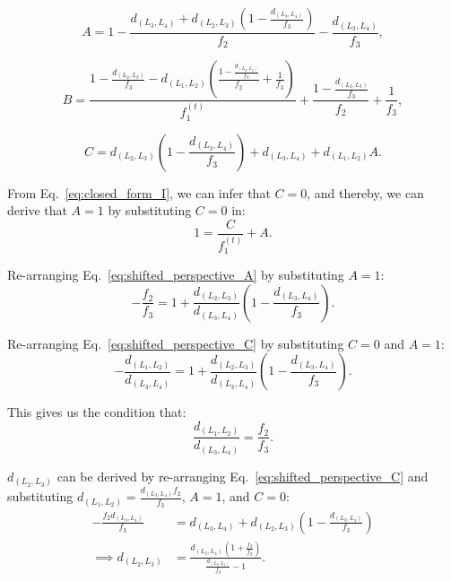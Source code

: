 \begin{equation}
    A = 1 - \frac{d_{(L_3,L_4)} + d_{(L_2,L_3)} \left(1 - \frac{d_{(L_3,L_4)}}{f_{3}}\right)}{f_{2}} - \frac{d_{(L_3,L_4)}}{f_{3}}, \label{eq:shifted_perspective_A}
\end{equation}

\begin{equation}
    B = \frac{1 - \frac{d_{(L_2,L_3)}}{f_{3}} - d_{(L_1,L_2)} \left(\frac{1 - \frac{d_{(L_2,L_3)}}{f_{3}}}{f_{2}} + \frac{1}{f_{3}}\right)}{f_1^{(t)}} + \frac{1 - \frac{d_{(L_2,L_3)}}{f_{3}}}{f_{2}} + \frac{1}{f_{3}},
    \label{eq:shifted_perspective_B}
\end{equation}

\begin{equation}
    C = d_{(L_2,L_3)} \left(1 - \frac{d_{(L_3,L_4)}}{f_{3}}\right) + d_{(L_3,L_4)} + d_{(L_1,L_2)}A.
    \label{eq:shifted_perspective_C}
\end{equation}

From Eq.~\eqref{eq:closed_form_I}, we can infer that $C=0$, and thereby, we can derive that $A=1$ by substituting $C=0$ in:
\begin{equation}
    1 = \frac{C}{f_1^{(t)}} + A.
\end{equation}

Re-arranging Eq.~\eqref{eq:shifted_perspective_A} by substituting $A = 1$:
\begin{equation}
    - \frac{f_2}{f_3} = 1 + \frac{d_{(L_2,L_3)}}{d_{(L_3,L_4)}}\left( 1 - \frac{d_{(L_3,L_4)}}{f_3}\right).
\end{equation}

Re-arranging Eq.~\eqref{eq:shifted_perspective_C} by substituting $C = 0$ and $A = 1$:
\begin{equation}
   - \frac{d_{(L_1,L_2)}}{d_{(L_3,L_4)}} = 1 + \frac{d_{(L_2,L_3)}}{d_{(L_3,L_4)}}\left( 1 - \frac{d_{(L_3,L_4)}}{f_{3}}\right).
\end{equation}

This gives us the condition that:
\begin{equation}
\frac{d_{(L_1,L_2)}}{d_{(L_3,L_4)}} = \frac{f_2}{f_3}.
\label{eq:closed_form_d_f_relation}
\end{equation}

$d_{(L_2,L_3)}$ can be derived by re-arranging Eq.~\eqref{eq:shifted_perspective_C} and substituting $d_{(L_1,L_2)}=\frac{d_{(L_3,L_4)}f_2}{f_3}$, $A = 1$, and $C=0$:
\begin{align}
    - \frac{f_2d_{(L_3,L_4)}}{f_3} &= d_{(L_3,L_4)} + d_{(L_2,L_3)}\left(1 - \frac{d_{(L_3,L_4)}}{f_3} \right)\nonumber\\
    \implies d_{(L_2,L_3)} &= \frac{d_{(L_3,L_4)}\left(1 + \frac{f_2}{f_3} \right)}{\frac{d_{(L_3,L_4)}}{f_3} - 1}.
    \label{eq:closed_form_d_23}
\end{align}

